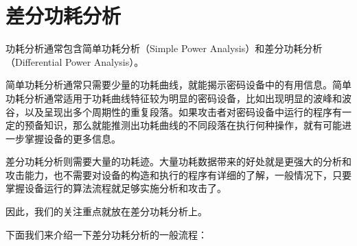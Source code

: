 \section{差分功耗分析} %
\label{sec:dpa}
功耗分析通常包含简单功耗分析（Simple Power Analysis）和差分功耗分析（Differential Power Analysis）。

简单功耗分析通常只需要少量的功耗曲线，就能揭示密码设备中的有用信息。简单功耗分析通常适用于功耗曲线特征较为明显的密码设备，比如出现明显的波峰和波谷，以及呈现出多个周期性的重复段落。如果攻击者对密码设备中运行的程序有一定的预备知识，那么就能推测出功耗曲线的不同段落在执行何种操作，就有可能进一步掌握设备的更多信息。

差分功耗分析则需要大量的功耗迹。大量功耗数据带来的好处就是更强大的分析和攻击能力，也不需要对设备的构造和执行的程序有详细的了解，一般情况下，只要掌握设备运行的算法流程就足够实施分析和攻击了。

因此，我们的关注重点就放在差分功耗分析上。

\vspace*{\baselineskip}

下面我们来介绍一下差分功耗分析的一般流程：

